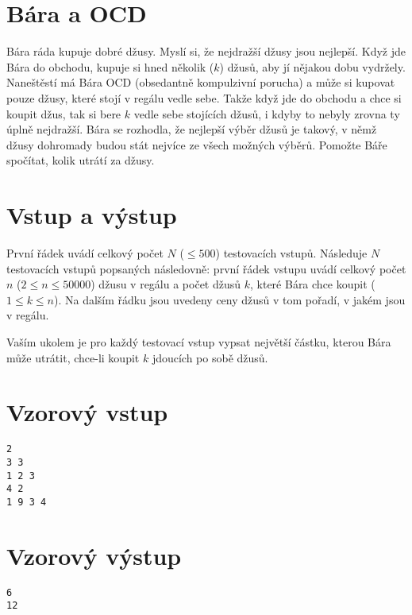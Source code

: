 \documentclass{article}
\begin{document}
\section*{\Huge Bára a OCD}
Bára ráda kupuje dobré džusy. Myslí si, že nejdražší džusy jsou nejlepší. Když jde Bára do obchodu, kupuje si hned několik ($k$) džusů, aby jí nějakou dobu vydržely. Naneštěstí má Bára OCD (obsedantně kompulzivní porucha) a může si kupovat pouze džusy, které stojí v regálu vedle sebe. Takže když jde do obchodu a chce si koupit džus, tak si bere $k$ vedle sebe stojících džusů, i kdyby to nebyly zrovna ty úplně nejdražší. Bára se rozhodla, že nejlepší výběr džusů je takový, v němž džusy dohromady budou stát nejvíce ze všech možných výběrů. Pomožte Báře spočítat, kolik utrátí za džusy.

\section*{Vstup a výstup}
První řádek uvádí celkový počet $N$ ($\leq 500$) testovacích vstupů. Následuje $N$ testovacích vstupů popsaných následovně: první řádek vstupu uvádí celkový počet $n$ ($2 \leq n \leq 50000$) džusu v regálu a počet džusů $k$, které Bára chce koupit ($1 \leq k \leq n$). Na dalším řádku jsou uvedeny ceny džusů v tom pořadí, v jakém jsou v regálu.

Vaším ukolem je pro každý testovací vstup vypsat největší částku, kterou Bára může utrátit, chce-li koupit $k$ jdoucích po sobě džusů.

\section*{Vzorový vstup}
\begin{verbatim}
2
3 3
1 2 3
4 2
1 9 3 4
\end{verbatim}

\section*{Vzorový výstup}
\begin{verbatim}
6
12
\end{verbatim}
\end{document}
